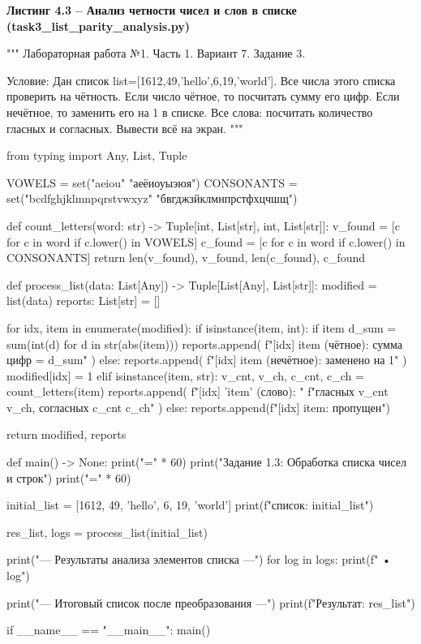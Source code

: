 \documentclass[14pt,a4paper]{extarticle}
\newcommand{\listingtitle}[1]{%
  \par\vspace{8pt}%
  \noindent\hspace*{1.25cm}\textbf{#1}\par\vspace{2pt}%
}
\begin{document}
\listingtitle{Листинг 4.3 -- Анализ четности чисел и слов в списке (task3\_list\_parity\_analysis.py)}
\begin{CodeListing}
"""
Лабораторная работа №1. Часть 1.
Вариант 7. Задание 3.

Условие:
Дан список list=[1612,49,'hello',6,19,'world’].
Все числа этого списка проверить на чётность. Если число чётное, то
посчитать сумму его цифр. Если нечётное, то заменить его на 1 в списке.
Все слова: посчитать количество гласных и согласных. Вывести всё на экран.
"""

from typing import Any, List, Tuple

VOWELS = set("aeiou" "аеёиоуыэюя")
CONSONANTS = set("bcdfghjklmnpqrstvwxyz" "бвгджзйклмнпрстфхцчшщ")


def count_letters(word: str) -> Tuple[int, List[str], int, List[str]]:
    v_found = [c for c in word if c.lower() in VOWELS]
    c_found = [c for c in word if c.lower() in CONSONANTS]
    return len(v_found), v_found, len(c_found), c_found


def process_list(data: List[Any]) -> Tuple[List[Any], List[str]]:
    modified = list(data)
    reports: List[str] = []

    for idx, item in enumerate(modified):
        if isinstance(item, int):
            if item %
                d_sum = sum(int(d) for d in str(abs(item)))
                reports.append(
                    f"[{idx}] {item} (чётное): сумма цифр = {d_sum}"
                )
            else:
                reports.append(
                    f"[{idx}] {item} (нечётное): заменено на 1"
                )
                modified[idx] = 1
        elif isinstance(item, str):
            v_cnt, v_ch, c_cnt, c_ch = count_letters(item)
            reports.append(
                f"[{idx}] '{item}' (слово): "
                f"гласных {v_cnt} {v_ch}, согласных {c_cnt} {c_ch}"
            )
        else:
            reports.append(f"[{idx}] {item}: пропущен")

    return modified, reports


def main() -> None:
    print("=" * 60)
    print("Задание 1.3: Обработка списка чисел и строк")
    print("=" * 60)

    initial_list = [1612, 49, 'hello', 6, 19, 'world']
    print(f" список: {initial_list}\n")

    res_list, logs = process_list(initial_list)

    print("--- Результаты анализа элементов списка ---")
    for log in logs:
        print(f"  • {log}")

    print("\n--- Итоговый список после преобразования ---")
    print(f"Результат: {res_list}\n")


if __name__ == "__main__":
    main()
\end{CodeListing}
\end{document}
